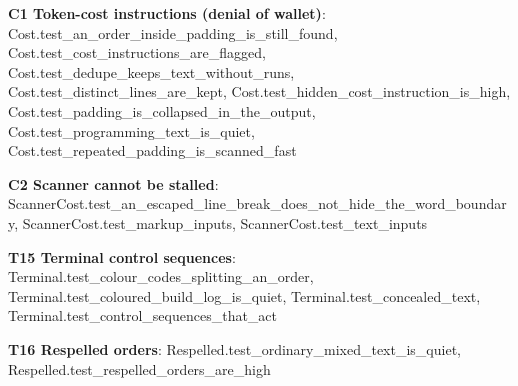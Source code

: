 \documentclass[10pt,a4paper]{article}
\begin{document}
\textbf{C1 Token-cost instructions (denial of wallet)}: \textcolor{ok}{Cost.\allowbreak{}test\_\allowbreak{}an\_\allowbreak{}order\_\allowbreak{}inside\_\allowbreak{}padding\_\allowbreak{}is\_\allowbreak{}still\_\allowbreak{}found}, \textcolor{ok}{Cost.\allowbreak{}test\_\allowbreak{}cost\_\allowbreak{}instructions\_\allowbreak{}are\_\allowbreak{}flagged}, \textcolor{ok}{Cost.\allowbreak{}test\_\allowbreak{}dedupe\_\allowbreak{}keeps\_\allowbreak{}text\_\allowbreak{}without\_\allowbreak{}runs}, \textcolor{ok}{Cost.\allowbreak{}test\_\allowbreak{}distinct\_\allowbreak{}lines\_\allowbreak{}are\_\allowbreak{}kept}, \textcolor{ok}{Cost.\allowbreak{}test\_\allowbreak{}hidden\_\allowbreak{}cost\_\allowbreak{}instruction\_\allowbreak{}is\_\allowbreak{}high}, \textcolor{ok}{Cost.\allowbreak{}test\_\allowbreak{}padding\_\allowbreak{}is\_\allowbreak{}collapsed\_\allowbreak{}in\_\allowbreak{}the\_\allowbreak{}output}, \textcolor{ok}{Cost.\allowbreak{}test\_\allowbreak{}programming\_\allowbreak{}text\_\allowbreak{}is\_\allowbreak{}quiet}, \textcolor{ok}{Cost.\allowbreak{}test\_\allowbreak{}repeated\_\allowbreak{}padding\_\allowbreak{}is\_\allowbreak{}scanned\_\allowbreak{}fast}\par
\textbf{C2 Scanner cannot be stalled}: \textcolor{ok}{ScannerCost.\allowbreak{}test\_\allowbreak{}an\_\allowbreak{}escaped\_\allowbreak{}line\_\allowbreak{}break\_\allowbreak{}does\_\allowbreak{}not\_\allowbreak{}hide\_\allowbreak{}the\_\allowbreak{}word\_\allowbreak{}boundary}, \textcolor{ok}{ScannerCost.\allowbreak{}test\_\allowbreak{}markup\_\allowbreak{}inputs}, \textcolor{ok}{ScannerCost.\allowbreak{}test\_\allowbreak{}text\_\allowbreak{}inputs}\par
\textbf{T15 Terminal control sequences}: \textcolor{ok}{Terminal.\allowbreak{}test\_\allowbreak{}colour\_\allowbreak{}codes\_\allowbreak{}splitting\_\allowbreak{}an\_\allowbreak{}order}, \textcolor{ok}{Terminal.\allowbreak{}test\_\allowbreak{}coloured\_\allowbreak{}build\_\allowbreak{}log\_\allowbreak{}is\_\allowbreak{}quiet}, \textcolor{ok}{Terminal.\allowbreak{}test\_\allowbreak{}concealed\_\allowbreak{}text}, \textcolor{ok}{Terminal.\allowbreak{}test\_\allowbreak{}control\_\allowbreak{}sequences\_\allowbreak{}that\_\allowbreak{}act}\par
\textbf{T16 Respelled orders}: \textcolor{ok}{Respelled.\allowbreak{}test\_\allowbreak{}ordinary\_\allowbreak{}mixed\_\allowbreak{}text\_\allowbreak{}is\_\allowbreak{}quiet}, \textcolor{ok}{Respelled.\allowbreak{}test\_\allowbreak{}respelled\_\allowbreak{}orders\_\allowbreak{}are\_\allowbreak{}high}\par
\end{document}
